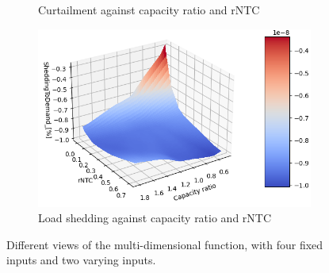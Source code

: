\begin{figure}[h]
\begin{subfigure}[b]{0.49\textwidth}
        \caption{Curtailment against capacity ratio and rNTC}
        \label{fig:surf-0-5-0}
    \end{subfigure}
    \hfill
    \begin{subfigure}[b]{0.49\textwidth}
        \includegraphics[width=\textwidth]{resources/images/view_0-5-1.png}
        \caption{Load shedding against capacity ratio and rNTC}
        \label{fig:surf-0-5-1}
    \end{subfigure}
    \caption{Different views of the multi-dimensional function, with four fixed inputs and two varying inputs.}
    \label{fig:all-views}
\end{figure}

